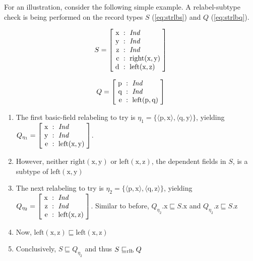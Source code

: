 
For an illustration, consider the following simple example.
A relabel-subtype check is being performed on the record types $S$ (\autoref{eq:strlbs}) and $Q$ (\autoref{eq:strlbq}).

\begin{equation}\label{eq:strlbs}
S = \rec{
    \text{x} &:& \type{Ind} \\
    \text{y} &:& \type{Ind} \\
    \text{z} &:& \type{Ind} \\
    \text{c} &:& \text{right}(\text{x}, \text{y}) \\
    \text{d} &:& \text{left}(\text{x}, \text{z})
    }
\end{equation}

\begin{equation}\label{eq:strlbq}
Q = \rec{
    \text{p} &:& \type{Ind} \\
    \text{q} &:& \type{Ind} \\
    \text{e} &:& \text{left}(\text{p}, \text{q})
    }
\end{equation}

\begin{enumerate}
\item The first basic-field relabeling to try is $\eta_1 = \{\langle \text{p}, \text{x}\rangle, \langle \text{q}, \text{y}\rangle\}$, yielding $Q_{\eta_1} = \rec{ \text{x} &:& \type{Ind} \\ \text{y} &:& \type{Ind} \\ \text{e} &:& \text{left}(\text{x}, \text{y}) }$.
\item However, neither $\text{right}(\text{x}, \text{y})$ or $\text{left}(\text{x}, \text{z})$, the dependent fields in $S$, is a subtype of $\text{left}(\text{x}, \text{y})$
\item The next relabeling to try is $\eta_2 = \{\langle \text{p}, \text{x}\rangle, \langle \text{q}, \text{z}\rangle\}$, yielding $Q_{\eta_2} = \rec{ \text{x} &:& \type{Ind} \\ \text{z} &:& \type{Ind} \\ \text{e} &:& \text{left}(\text{x}, \text{z}) }$.
Similar to before, $Q_{\eta_2}.\text{x} \sqsubseteq S.\text{x}$ and $Q_{\eta_2}.\text{z} \sqsubseteq S.\text{z}$
\item Now, $\text{left}(\text{x}, \text{z}) \sqsubseteq \text{left}(\text{x}, \text{z})$
\item Conclusively, $S \sqsubseteq Q_{\eta_2}$ and thus $S \mathrel{\sqsubseteq_\text{rlb}} Q$
\end{enumerate}



